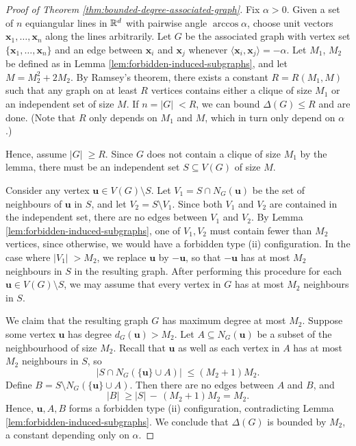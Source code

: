 \begin{proof}[Proof of Theorem \ref{thm:bounded-degree-associated-graph}]
    Fix $\alpha > 0$.
    Given a set of $n$ equiangular lines in $\mathbb{R}^d$ with pairwise angle $\arccos \alpha$, choose unit vectors $\bm{x}_1, \dots, \bm{x}_n$ along the lines arbitrarily.
    Let $G$ be the associated graph with vertex set $\{ \bm{x}_1, \dots, \bm{x}_n \}$ and an edge between $\bm{x}_i$ and $\bm{x}_j$ whenever $\langle \bm{x}_i, \bm{x}_j \rangle = -\alpha$.
    Let $M_1$, $M_2$ be defined as in Lemma \ref{lem:forbidden-induced-subgraphs}, and let $M = M_2^2 + 2M_2$.
    By Ramsey's theorem, there exists a constant $R = R(M_1, M)$ such that any graph on at least $R$ vertices contains either a clique of size $M_1$ or an independent set of size $M$.
    If $n = |G|\; < R$, we can bound $\Delta (G) \le R$ and are done. 
    (Note that $R$ only depends on $M_1$ and $M$, which in turn only depend on $\alpha$.)
    
    Hence, assume $|G|\; \ge R$. 
    Since $G$ does not contain a clique of size $M_1$ by the lemma, there must be an independent set $S \subseteq V(G)$ of size $M$.

    Consider any vertex $\bm{u} \in V(G) \setminus S$. 
    Let $V_1 = S \cap N_G(\bm{u})$ be the set of neighbours of $\bm{u}$ in $S$, and let $V_2 = S \setminus V_1$. 
    Since both $V_1$ and $V_2$ are contained in the independent set, there are no edges between $V_1$ and $V_2$. 
    By Lemma \ref{lem:forbidden-induced-subgraphs}, one of $V_1, V_2$ must contain fewer than $M_2$ vertices, since otherwise, we would have a forbidden type (ii) configuration.
    In the case where $|V_1|\; > M_2$, we replace $\bm{u}$ by $-\bm{u}$, so that $-\bm{u}$ has at most $M_2$ neighbours in $S$ in the resulting graph.
    After performing this procedure for each $\bm{u} \in V(G) \setminus S$, we may assume that every vertex in $G$ has at most $M_2$ neighbours in $S$.

    We claim that the resulting graph $G$ has maximum degree at most $M_2$.
    Suppose some vertex $\bm{u}$ has degree $d_G(\bm{u}) > M_2$. 
    Let $A \subseteq N_G(\bm{u})$ be a subset of the neighbourhood of size $M_2$. 
    Recall that $\bm{u}$ as well as each vertex in $A$ has at most $M_2$ neighbours in $S$, so 
    \begin{equation*}
        |S \cap N_G(\{ \bm{u}\} \cup A) |\; \le (M_2 + 1) M_2.
    \end{equation*}
    Define $B = S \setminus N_G(\{ \bm{u} \} \cup A)$. 
    Then there are no edges between $A$ and $B$, and 
    \begin{equation*}
        |B|\; \ge |S|\, -\, (M_2 + 1) M_2 = M_2.
    \end{equation*}
    Hence, $\bm{u}, A, B$ forms a forbidden type (ii) configuration, contradicting Lemma \ref{lem:forbidden-induced-subgraphs}.
    We conclude that $\Delta(G)$ is bounded by $M_2$, a constant depending only on $\alpha$.
\end{proof}

